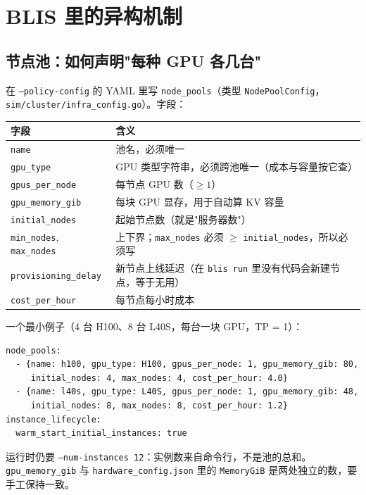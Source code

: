 \documentclass[11pt,a4paper,fontset=windows]{ctexart}
\begin{document}
\section{BLIS 里的异构机制}

\subsection{节点池：如何声明"每种 GPU 各几台"}

在 \texttt{--policy-config} 的 YAML 里写 \texttt{node\_pools}（类型 \texttt{NodePoolConfig}，\texttt{sim/cluster/infra\_config.go}）。字段：

\begin{center}\begin{tabular}{ll}\toprule
字段 & 含义 \\ \midrule
\texttt{name} & 池名，必须唯一 \\
\texttt{gpu\_type} & GPU 类型字符串，必须跨池唯一（成本与容量按它查） \\
\texttt{gpus\_per\_node} & 每节点 GPU 数（$\ge 1$） \\
\texttt{gpu\_memory\_gib} & 每块 GPU 显存，用于自动算 KV 容量 \\
\texttt{initial\_nodes} & 起始节点数（就是"服务器数"） \\
\texttt{min\_nodes}, \texttt{max\_nodes} & 上下界；\texttt{max\_nodes} 必须 $\ge$ \texttt{initial\_nodes}，所以必须写 \\
\texttt{provisioning\_delay} & 新节点上线延迟（在 \texttt{blis run} 里没有代码会新建节点，等于无用） \\
\texttt{cost\_per\_hour} & 每节点每小时成本 \\ \bottomrule
\end{tabular}\end{center}

一个最小例子（4 台 H100、8 台 L40S，每台一块 GPU，TP = 1）：
\begin{verbatim}
node_pools:
  - {name: h100, gpu_type: H100, gpus_per_node: 1, gpu_memory_gib: 80,
     initial_nodes: 4, max_nodes: 4, cost_per_hour: 4.0}
  - {name: l40s, gpu_type: L40S, gpus_per_node: 1, gpu_memory_gib: 48,
     initial_nodes: 8, max_nodes: 8, cost_per_hour: 1.2}
instance_lifecycle:
  warm_start_initial_instances: true
\end{verbatim}
运行时仍要 \texttt{--num-instances 12}：实例数来自命令行，不是池的总和。\texttt{gpu\_memory\_gib} 与 \texttt{hardware\_config.json} 里的 \texttt{MemoryGiB} 是两处独立的数，要手工保持一致。
\end{document}

